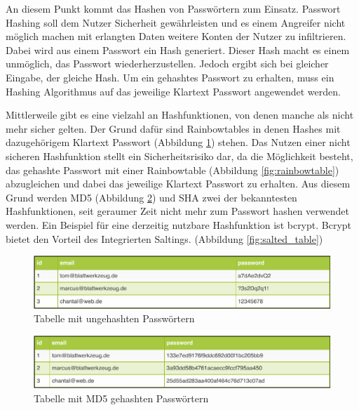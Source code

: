 
An diesem Punkt kommt das Hashen von Passwörtern zum Einsatz. Passwort Hashing soll dem Nutzer Sicherheit gewährleisten und es einem Angreifer nicht möglich machen mit erlangten Daten weitere Konten der Nutzer zu infiltrieren. Dabei wird aus einem Passwort ein Hash generiert. Dieser Hash macht es einem unmöglich, das Passwort wiederherzustellen. Jedoch ergibt sich bei gleicher Eingabe, der gleiche Hash. Um ein gehashtes Passwort zu erhalten, muss ein Hashing Algorithmus auf das jeweilige Klartext Passwort angewendet werden.

Mittlerweile gibt es eine vielzahl an Hashfunktionen, von denen manche als nicht mehr sicher gelten. Der Grund dafür sind Rainbowtables in denen Hashes mit dazugehörigem Klartext Passwort (Abbildung \ref{fig:unhashed_table}) stehen. Das Nutzen einer nicht sicheren Hashfunktion stellt ein Sicherheitsrisiko dar, da die Möglichkeit besteht, das gehashte Passwort mit einer Rainbowtable (Abbildung \ref{fig:rainbowtable}) abzugleichen und dabei das jeweilige Klartext Passwort zu erhalten. Aus diesem Grund werden MD5 (Abbildung \ref{fig:md5_hashed_table}) und SHA zwei der bekanntesten Hashfunktionen, seit geraumer Zeit nicht mehr zum Passwort hashen verwendet werden. Ein Beispiel für eine derzeitig nutzbare Hashfunktion ist bcrypt. Bcrypt bietet den Vorteil des Integrierten Saltings. (Abbildung \ref{fig:salted_table})

\begin{figure}
	\includegraphics[width=\textwidth]{graphics/unhashed_table.pdf}
	\caption{Tabelle mit ungehashten Passwörtern}
	\label{fig:unhashed_table}
\end{figure}

\begin{figure}
	\includegraphics[width=\textwidth]{graphics/md5_table.pdf}
	\caption{Tabelle mit MD5 gehashten Passwörtern}
	\label{fig:md5_hashed_table}
\end{figure}

